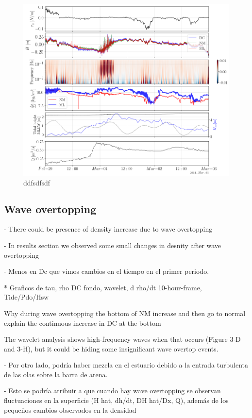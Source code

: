 \documentclass[tesis.tex]{subfiles}
\begin{document}
\begin{figure}[h!]
    \centering
    \includegraphics[width=\textwidth]{Imagenes/mix_q.png}
    \caption{ddfsdfsdf }
    \label{fig:mix_q}
\end{figure}

\subsection{Wave overtopping}

- There could be presence of density increase due to wave overtopping 

- In results section we observed some small changes in desnity after wave overtopping 

- Menos en Dc que vimos cambios en el tiempo en el primer periodo.

* Graficos de tau, rho DC fondo, wavelet, d rho/dt 10-hour-frame, Tide/Pdo/Hsw

Why during wave overtopping the bottom of NM increase and then go to normal
explain the  continuous increase in DC at the bottom

The wavelet analysis shows high-frequency waves when that occurs (Figure 3-D and 3-H), but it could be hiding some insignificant wave overtop events.

- Por otro lado, podría haber mezcla en el estuario debido a la entrada turbulenta de las olas sobre la barra de arena.

- Esto se podría atribuir a que cuando hay wave overtopping se observan fluctuaciones en la superficie (H hat, dh/dt, DH hat/Dx, Q), además de los pequeños cambios observados en la densidad
\end{document}
